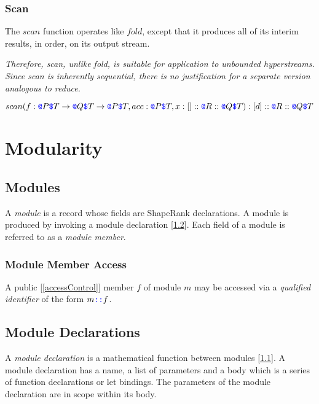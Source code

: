 \documentclass{article}
\begin{document}
\subsubsection{Scan}
\label{scan}

The $scan$ function operates like $fold$, except that it produces all of its interim results, in order, on its output stream. 

{\em 
Therefore, scan, unlike fold, is suitable for application to unbounded hyperstreams. Since scan is inherently sequential, there is no justification for a separate version analogous to reduce.
}

$scan(f: \texttt{\color{blue} @}{}P \texttt{\color{blue} \$}{}T \to{} \texttt{\color{blue} @}{}Q \texttt{\color{blue} \$}{}T \to{} \texttt{\color{blue} @}{}P \texttt{\color{blue} \$}{}T, acc: \texttt{\color{blue} @}{}P \texttt{\color{blue} \$}{}T, x:[]::\texttt{\color{blue} @}{}R::\texttt{\color{blue} @}{}Q \texttt{\color{blue} \$}{}T):[d]::\texttt{\color{blue} @}{}R::\texttt{\color{blue} @}{}Q \texttt{\color{blue} \$}{}T$

\section{Modularity}
\label{modularity}

\subsection{Modules}
\label{modules}

A {\em module} is a record whose fields are ShapeRank declarations. A module is produced by invoking a module declaration [\ref{moduleDeclarations}].
Each field of a module is referred to as a {\em module member}.

\subsubsection{Module Member Access}
\label{moduleMemberAccess}

A public [\ref{accessControl}] member  $f$ of module $m$ may be accessed via a {\em qualified identifier} of the form $m \texttt{\color{blue} ::}{} f$.




\subsection{Module Declarations}
\label{moduleDeclarations}

A {\em module declaration} is a mathematical function between modules [\ref{modules}].  A module declaration has a name, a list of parameters and a body which is a series of function declarations or let bindings.  The parameters  of the module declaration are in scope within its body.
\end{document}
